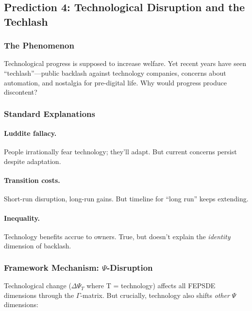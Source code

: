 \subsection{Prediction 4: Technological Disruption and the Techlash}
\label{subsec:pred-techlash}

\subsubsection{The Phenomenon}

Technological progress is supposed to increase welfare. Yet recent years 
have seen ``techlash''---public backlash against technology companies, 
concerns about automation, and nostalgia for pre-digital life. Why would 
progress produce discontent?

\subsubsection{Standard Explanations}

\paragraph{Luddite fallacy.} People irrationally fear technology; they'll adapt.
But current concerns persist despite adaptation.

\paragraph{Transition costs.} Short-run disruption, long-run gains.
But timeline for ``long run'' keeps extending.

\paragraph{Inequality.} Technology benefits accrue to owners.
True, but doesn't explain the \emph{identity} dimension of backlash.

\subsubsection{Framework Mechanism: $\Psi$-Disruption}

Technological change ($\Delta \Psi_T$ where T = technology) affects all 
FEPSDE dimensions through the $\Gamma$-matrix. But crucially, technology 
also shifts \emph{other} $\Psi$ dimensions:

